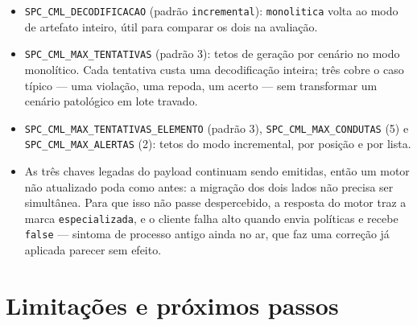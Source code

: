 \documentclass[11pt,a4paper]{article}
\begin{document}
\begin{itemize}[leftmargin=*,itemsep=1pt]
\item \texttt{SPC\_CML\_DECODIFICACAO} (padrão \texttt{incremental}):
\texttt{monolitica} volta ao modo de artefato inteiro, útil para comparar os dois
na avaliação.
\item \texttt{SPC\_CML\_MAX\_TENTATIVAS} (padrão 3): tetos de geração por
cenário no modo monolítico. Cada tentativa custa uma decodificação inteira; três
cobre o caso típico --- uma violação, uma repoda, um acerto --- sem transformar
um cenário patológico em lote travado.
\item \texttt{SPC\_CML\_MAX\_TENTATIVAS\_ELEMENTO} (padrão 3),
\texttt{SPC\_CML\_MAX\_CONDUTAS} (5) e \texttt{SPC\_CML\_MAX\_ALERTAS} (2):
tetos do modo incremental, por posição e por lista.
\item As três chaves legadas do payload continuam sendo emitidas, então um motor
não atualizado poda como antes: a migração dos dois lados não precisa ser
simultânea. Para que isso não passe despercebido, a resposta do motor traz a
marca \texttt{especializada}, e o cliente falha alto quando envia políticas e
recebe \texttt{false} --- sintoma de processo antigo ainda no ar, que faz uma
correção já aplicada parecer sem efeito.
\end{itemize}

\section{Limitações e próximos passos}
\end{document}
